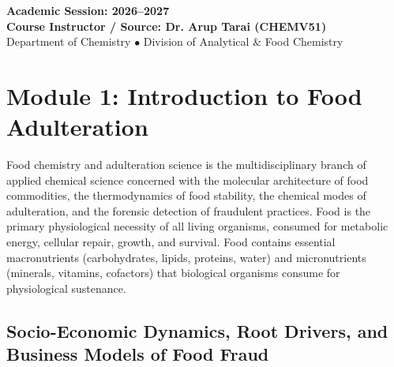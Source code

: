 \documentclass[11pt,a4paper,oneside]{article}
\begin{document}
\begin{titlepage}
    \vfill
    {\large \textbf{Academic Session: 2026--2027}}\\[0.2cm]
    {\large \bfseries \color{primarynavy} Course Instructor / Source: Dr. Arup Tarai (CHEMV51)}\\[0.15cm]
    {\small \color{darkslate} Department of Chemistry $\bullet$ Division of Analytical \& Food Chemistry}
\end{titlepage}

\newpage
\tableofcontents
\newpage

\section{Module 1: Introduction to Food Adulteration}

Food chemistry and adulteration science is the multidisciplinary branch of applied chemical science concerned with the molecular architecture of food commodities, the thermodynamics of food stability, the chemical modes of adulteration, and the forensic detection of fraudulent practices. Food is the primary physiological necessity of all living organisms, consumed for metabolic energy, cellular repair, growth, and survival. Food contains essential macronutrients (carbohydrates, lipids, proteins, water) and micronutrients (minerals, vitamins, cofactors) that biological organisms consume for physiological sustenance.

\subsection{Socio-Economic Dynamics, Root Drivers, and Business Models of Food Fraud}
\end{document}
